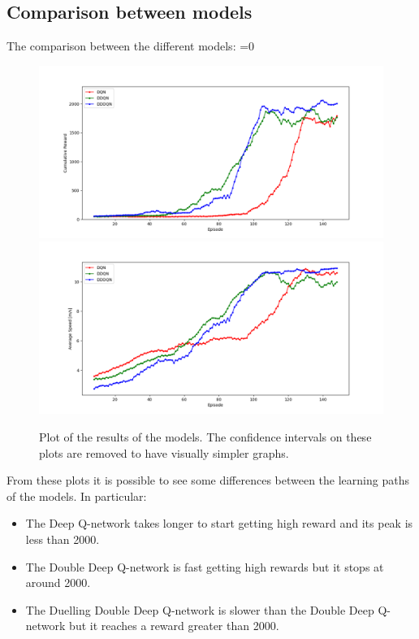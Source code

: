 \documentclass[14pt]{extarticle}
\def\sp{\vspace{5pt}}
\newcounter{debug}
\begin{document}
\begin{flushleft}
\subsection{Comparison between models}
\sp
The comparison between the different models:
\ifnum\value{debug}=0 {
	\begin{figure}[H]
    		\centering\includegraphics[width=1\textwidth]{./Image/Results/Comparison/rewards.png}
    		\vspace{-5mm}
    		\centering\includegraphics[width=1\textwidth]{./Image/Results/Comparison/speeds.png}
		\caption{Plot of the results of the models. The confidence intervals on these plots are removed to have visually simpler graphs.}
	\end{figure}
	}\fi
	From these plots it is possible to see some differences between the learning paths of the models. In particular:
	\begin{itemize}
	\item The Deep Q-network takes longer to start getting high reward and its peak is less than 2000.
	\item The Double Deep Q-network is fast getting high rewards but it stops at around 2000.
	\item The Duelling Double Deep Q-network is slower than the Double Deep Q-network but it reaches a reward greater than 2000.
	\end{itemize}
	

\end{flushleft}
\end{document}
